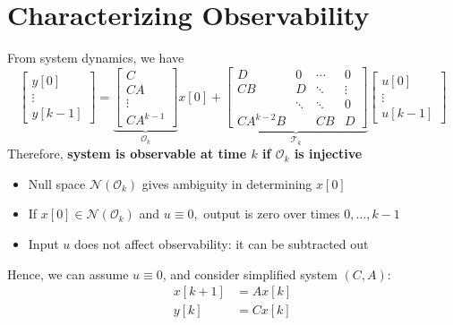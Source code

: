 \documentclass[10pt,a4paper,oneside]{article}
\begin{document}
\section{Characterizing Observability}
From system dynamics, we have
\[
\left[\begin{array}{c}{y[0]} \\ {\vdots} \\ {y[k-1]}\end{array}\right]=
\underbrace{\left[\begin{array}{c}{C} \\ {C A} \\ {\vdots} \\ {CA^{k-1}}\end{array}\right]}_{\mathcal{O}_{k}}x[0]+\underbrace{\left[\begin{array}{cccc}{D} & {0} & {\cdots} & {0} \\ {C B} & {D} & {\ddots} & {\vdots} \\ {} & {\ddots} & {\ddots} & {0} \\ {C A^{k-2} B} & {} & {C B} & {D}\end{array}\right]}_{\mathcal{T}_k}\left[\begin{array}{c}{u[0]} \\ {\vdots} \\ {u[k-1]}\end{array}\right]
\]
Therefore, {\bfseries system is observable at time $k$ if $\mathcal{O}_k$ is injective}
\begin{itemize}
\item Null space $\mathcal{N}\left(\mathcal{O}_{k}\right)$ gives ambiguity in determining $x[0]$
\item If $x[0] \in \mathcal{N}\left(\mathcal{O}_{k}\right)$ and $u \equiv 0,$ output is zero over times $0, \ldots, k-1$
\item Input $u$ does not affect observability: it can be subtracted out
\end{itemize}
Hence, we can assume $u\equiv0$, and consider simplified system $(C,A)$:
\[
\begin{aligned} x[k+1] &=A x[k] \\ y[k] &=C x[k] \end{aligned}
\]
\end{document}
